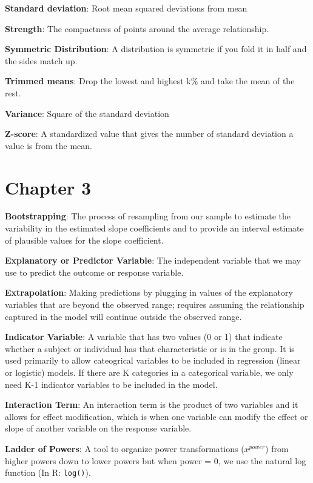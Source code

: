 \documentclass[
]{book}
\begin{document}
\textbf{Standard deviation}: Root mean squared deviations from mean

\textbf{Strength}: The compactness of points around the average relationship.

\textbf{Symmetric Distribution}: A distribution is symmetric if you fold it in half and the sides match up.

\textbf{Trimmed means}: Drop the lowest and highest k\% and take the mean of the rest.

\textbf{Variance}: Square of the standard deviation

\textbf{Z-score}: A standardized value that gives the number of standard deviation a value is from the mean.

\hypertarget{chapter-3}{%
\section{Chapter 3}\label{chapter-3}}

\textbf{Bootstrapping}: The process of resampling from our sample to estimate the variability in the estimated slope coefficients and to provide an interval estimate of plausible values for the slope coefficient.

\textbf{Explanatory or Predictor Variable}: The independent variable that we may use to predict the outcome or response variable.

\textbf{Extrapolation}: Making predictions by plugging in values of the explanatory variables that are beyond the observed range; requires assuming the relationship captured in the model will continue outside the observed range.

\textbf{Indicator Variable}: A variable that has two values (0 or 1) that indicate whether a subject or individual has that characteristic or is in the group. It is used primarily to allow cateogrical variables to be included in regression (linear or logistic) models. If there are K categories in a categorical variable, we only need K-1 indicator variables to be included in the model.

\textbf{Interaction Term}: An interaction term is the product of two variables and it allows for effect modification, which is when one variable can modify the effect or slope of another variable on the response variable.

\textbf{Ladder of Powers}: A tool to organize power transformations (\(x^{power}\)) from higher powers down to lower powers but when power = 0, we use the natural log function (In R: \texttt{log()}).
\end{document}
